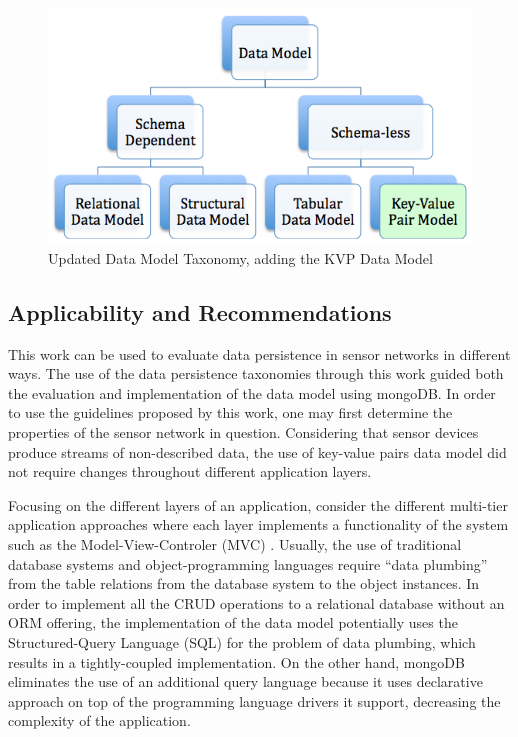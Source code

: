 \begin{figure}[!h]
  \centering
  \includegraphics[scale=0.65]{../diagrams/taxonomy-data-model-modified}
  \caption{Updated Data Model Taxonomy, adding the KVP Data Model}
  \label{fig:taxonomy-data-model-modified}
\end{figure}

\subsection{Applicability and Recommendations}

This work can be used to evaluate data persistence in sensor networks in
different ways. The use of the data persistence taxonomies through this work
guided both the evaluation and implementation of the data model using mongoDB.
In order to use the guidelines proposed by this work, one may first determine
the properties of the sensor network in question. Considering that sensor
devices produce streams of non-described data, the use of key-value pairs data
model did not require changes throughout different application layers.

Focusing on the different layers of an application, consider the different
multi-tier application approaches where each layer implements a functionality
of the system such as the Model-View-Controler (MVC) \cite{sw-architectures}.
Usually, the use of traditional database systems and object-programming 
languages require ``data plumbing'' from the table relations from
the database system to the object instances. In order to implement all the
CRUD operations to a relational database without an ORM \cite{orm} offering,
the implementation of the data model potentially uses the Structured-Query
Language (SQL) for the problem of data plumbing, which results in a
tightly-coupled implementation. On the other hand, mongoDB eliminates the use
of an additional query language because it uses declarative approach on top of
the programming language drivers it support, decreasing the complexity of the
application.

